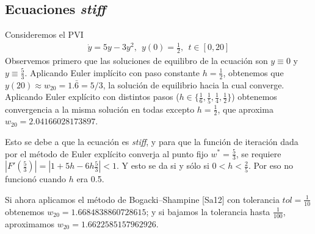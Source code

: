 \documentclass[spanish]{article}
\begin{document}
\noindent
\subsection{Ecuaciones \textit{stiff}}
Consideremos el PVI
\begin{align*}
\dot{y} = 5y-3y^2, \ \ y(0) = \frac{1}{2}, \ \ t \in [0,20]
\end{align*}
Observemos primero que las soluciones de equilibro de la ecuación son $y \equiv 0$ y 
$y \equiv \frac{5}{3}$.
Aplicando Euler implícito con paso constante $h = \frac{1}{2}$, obtenemos que
$y(20) \approx w_{20} = 1.\bar{6} = 5/3$, la solución de equilibrio hacia
la cual converge.
Aplicando Euler explícito con distintos pasos ($h \in \{\frac{1}{6}, \frac{1}{5}, 
\frac{1}{4}, \frac{1}{2} \}$) obtenemos convergencia a la misma solución en todas
excepto $h = \frac{1}{2}$, que aproxima $w_{20} = 2.04166028173897$.

Esto se debe a que la ecuación es \textit{stiff}, y para que la función de iteración
dada por el método de Euler explícito converja al punto fijo $w^* = \frac{5}{3}$, se
requiere $|F'(\frac{5}{3})| = |1+5h-6h\frac{5}{3}|<1$. Y esto se da si y sólo si 
$0 < h < \frac{2}{5}$. Por eso no funcionó cuando $h$ era 0.5.

Si ahora aplicamos el método de Bogacki–Shampine [Sa12]  con tolerancia $tol = 
\frac{1}{10}$  obtenemos $w_{20} = 1.6684838860728615$; y si bajamos la tolerancia 
hasta  $\frac{1}{100}$, aproximamos $w_{20} = 1.6622585157962926$. 
\end{document}
